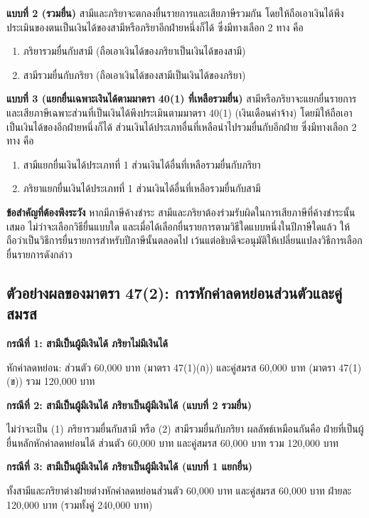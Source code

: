 \documentclass[12pt,a4paper]{article}
\begin{document}
\textbf{แบบที่ 2 (รวมยื่น)} สามีและภริยาจะตกลงยื่นรายการและเสียภาษีรวมกัน โดยให้ถือเอาเงินได้พึงประเมินของตนเป็นเงินได้ของสามีหรือภริยาอีกฝ่ายหนึ่งก็ได้ ซึ่งมีทางเลือก 2 ทาง คือ
\begin{enumerate}
    \item ภริยารวมยื่นกับสามี (ถือเอาเงินได้ของภริยาเป็นเงินได้ของสามี)
    \item สามีรวมยื่นกับภริยา (ถือเอาเงินได้ของสามีเป็นเงินได้ของภริยา)
\end{enumerate}

\textbf{แบบที่ 3 (แยกยื่นเฉพาะเงินได้ตามมาตรา 40(1) ที่เหลือรวมยื่น)} สามีหรือภริยาจะแยกยื่นรายการและเสียภาษีเฉพาะส่วนที่เป็นเงินได้พึงประเมินตามมาตรา 40(1) (เงินเดือนค่าจ้าง) โดยมิให้ถือเอาเป็นเงินได้ของอีกฝ่ายหนึ่งก็ได้ ส่วนเงินได้ประเภทอื่นที่เหลือนำไปรวมยื่นกับอีกฝ่าย ซึ่งมีทางเลือก 2 ทาง คือ
\begin{enumerate}
    \item สามีแยกยื่นเงินได้ประเภทที่ 1 ส่วนเงินได้อื่นที่เหลือรวมยื่นกับภริยา
    \item ภริยาแยกยื่นเงินได้ประเภทที่ 1 ส่วนเงินได้อื่นที่เหลือรวมยื่นกับสามี
\end{enumerate}

\textbf{ข้อสำคัญที่ต้องพึงระวัง} หากมีภาษีค้างชำระ สามีและภริยาต้องร่วมรับผิดในการเสียภาษีที่ค้างชำระนั้นเสมอ ไม่ว่าจะเลือกวิธียื่นแบบใด และเมื่อได้เลือกยื่นรายการตามวิธีใดแบบหนึ่งในปีภาษีใดแล้ว ให้ถือว่าเป็นวิธีการยื่นรายการสำหรับปีภาษีนั้นตลอดไป เว้นแต่อธิบดีจะอนุมัติให้เปลี่ยนแปลงวิธีการเลือกยื่นรายการดังกล่าว

\subsection*{ตัวอย่างผลของมาตรา 47(2): การหักค่าลดหย่อนส่วนตัวและคู่สมรส}

\textbf{กรณีที่ 1: สามีเป็นผู้มีเงินได้ ภริยาไม่มีเงินได้}

หักค่าลดหย่อน: ส่วนตัว 60,000 บาท (มาตรา 47(1)(ก)) และคู่สมรส 60,000 บาท (มาตรา 47(1)(ข)) รวม 120,000 บาท

\textbf{กรณีที่ 2: สามีเป็นผู้มีเงินได้ ภริยาเป็นผู้มีเงินได้ (แบบที่ 2 รวมยื่น)}

ไม่ว่าจะเป็น (1) ภริยารวมยื่นกับสามี หรือ (2) สามีรวมยื่นกับภริยา ผลลัพธ์เหมือนกันคือ ฝ่ายที่เป็นผู้ยื่นหลักหักค่าลดหย่อนได้ ส่วนตัว 60,000 บาท และคู่สมรส 60,000 บาท รวม 120,000 บาท

\textbf{กรณีที่ 3: สามีเป็นผู้มีเงินได้ ภริยาเป็นผู้มีเงินได้ (แบบที่ 1 แยกยื่น)}

ทั้งสามีและภริยาต่างฝ่ายต่างหักค่าลดหย่อนส่วนตัว 60,000 บาท และคู่สมรส 60,000 บาท ฝ่ายละ 120,000 บาท (รวมทั้งคู่ 240,000 บาท)
\end{document}
